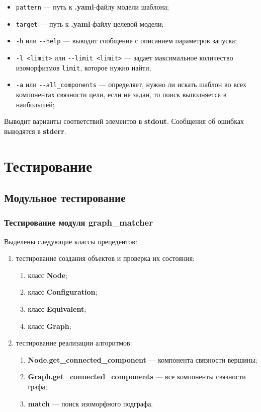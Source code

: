 \begin{itemize}
\item \verb;pattern; --- путь к \textbf{.yaml}-файлу модели шаблона;
\item \verb;target; --- путь к \textbf{.yaml}-файлу целевой модели;
\item \verb;-h; или \verb;--help; --- выводит сообщение с описанием параметров
запуска;
\item \verb;-l <limit>; или \verb;--limit <limit>; --- задает максимальное
количество изоморфизмов \verb;limit;, которое нужно найти;
\item \verb;-a; или \verb;--all_components; --- определяет, нужно ли искать
шаблон во всех компонентах связности цели, если не задан, то поиск выполняется
в наибольшей;
\end{itemize}

Выводит варианты соответствий элементов в \textbf{stdout}.
Сообщения об ошибках выводятся в \textbf{stderr}.

\section{Тестирование}

\subsection{Модульное тестирование}

\subsubsection{Тестирование модуля graph\_matcher}

Выделены следующие классы прецедентов:
\begin{enumerate}
    \item тестирование создания объектов и проверка их состояния:
    \begin{enumerate}
        \item класс \textbf{Node};
        \item класс \textbf{Configuration};
        \item класс \textbf{Equivalent};
        \item класс \textbf{Graph};
    \end{enumerate}
    \item тестирование реализации алгоритмов:
    \begin{enumerate}
        \item \textbf{Node.get\_connected\_component} --- компонента связности вершины;
        \item \textbf{Graph.get\_connected\_components} --- все компоненты связности графа;
        \item \textbf{match} --- поиск изоморфного подграфа.
    \end{enumerate}
\end{enumerate}

